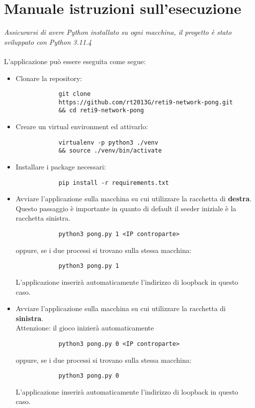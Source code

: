 
\thispagestyle{headings}
\newpage
\section{Manuale istruzioni sull'esecuzione}\label{sec:istruzioni}
\textit{Assicurarsi di avere Python installato su ogni macchina, il progetto è stato sviluppato con Python 3.11.4} \\ \\
L'applicazione può essere eseguita come segue:
\begin{itemize}
    \item Clonare la repository:
        \begin{verbatim}
            git clone
            https://github.com/rt2013G/reti9-network-pong.git
            && cd reti9-network-pong
        \end{verbatim}
    \item Creare un virtual environment ed attivarlo:
        \begin{verbatim}
            virtualenv -p python3 ./venv
            && source ./venv/bin/activate
        \end{verbatim}
    \item Installare i package necessari:
        \begin{verbatim}
            pip install -r requirements.txt
        \end{verbatim}
    \item Avviare l'applicazione sulla macchina su cui utilizzare la racchetta di \textbf{destra}. \\
    Questo passaggio è importante in quanto di default il seeder iniziale è la racchetta sinistra. \\
        \begin{verbatim}
            python3 pong.py 1 <IP controparte>
        \end{verbatim}
        oppure, se i due processi si trovano sulla stessa macchina:
        \begin{verbatim}
            python3 pong.py 1
        \end{verbatim}
        L'applicazione inserirà automaticamente l'indirizzo di loopback in questo caso.
    \item Avviare l'applicazione sulla macchina su cui utilizzare la racchetta di \textbf{sinistra}. \\
    Attenzione: il gioco inizierà automaticamente
        \begin{verbatim}
            python3 pong.py 0 <IP controparte>
        \end{verbatim}
        oppure, se i due processi si trovano sulla stessa macchina:
        \begin{verbatim}
            python3 pong.py 0
        \end{verbatim}
        L'applicazione inserirà automaticamente l'indirizzo di loopback in questo caso.
\end{itemize}
